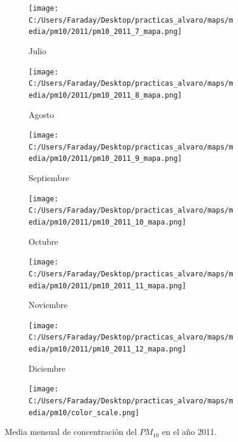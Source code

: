 \documentclass[12pt]{article}
\begin{document}
\begin{figure}[H]
\begin{subfigure}[H]{0.15\textwidth}
\texttt{[image: C:/Users/Faraday/Desktop/practicas\_alvaro/maps/media/pm10/2011/pm10\_2011\_7\_mapa.png]}
\captionsetup{labelformat=empty}
\caption{Julio}
\label{fig:map-pm10-2011-7}
\end{subfigure}
%
\begin{subfigure}[H]{0.15\textwidth}
\texttt{[image: C:/Users/Faraday/Desktop/practicas\_alvaro/maps/media/pm10/2011/pm10\_2011\_8\_mapa.png]}
\captionsetup{labelformat=empty}
\caption{Agosto}
\label{fig:map-pm10-2011-8}
\end{subfigure}
%
\begin{subfigure}[H]{0.15\textwidth}
\texttt{[image: C:/Users/Faraday/Desktop/practicas\_alvaro/maps/media/pm10/2011/pm10\_2011\_9\_mapa.png]}
\captionsetup{labelformat=empty}
\caption{Septiembre}
\label{fig:map-pm10-2011-9}
\end{subfigure}
%
\begin{subfigure}[H]{0.15\textwidth}
\texttt{[image: C:/Users/Faraday/Desktop/practicas\_alvaro/maps/media/pm10/2011/pm10\_2011\_10\_mapa.png]}
\captionsetup{labelformat=empty}
\caption{Octubre}
\label{fig:map-pm10-2011-10}
\end{subfigure}
%
\begin{subfigure}[H]{0.15\textwidth}
\texttt{[image: C:/Users/Faraday/Desktop/practicas\_alvaro/maps/media/pm10/2011/pm10\_2011\_11\_mapa.png]}
\captionsetup{labelformat=empty}
\caption{Noviembre}
\label{fig:map-pm10-2011-11}
\end{subfigure}
%
\begin{subfigure}[H]{0.15\textwidth}
\texttt{[image: C:/Users/Faraday/Desktop/practicas\_alvaro/maps/media/pm10/2011/pm10\_2011\_12\_mapa.png]}
\captionsetup{labelformat=empty}
\caption{Diciembre}
\label{fig:map-pm10-2011-12}
\end{subfigure}

\begin{subfigure}[H]{0.45\textwidth}
\texttt{[image: C:/Users/Faraday/Desktop/practicas\_alvaro/maps/media/pm10/color\_scale.png]}
\captionsetup{labelformat=empty}
\caption{}
\end{subfigure}

\vspace*{-7mm}
\caption{Media mensual de concentración del $PM_{10}$ en el año 2011.}
\label{fig:map-pm10-2011}
\end{figure}
\end{document}
